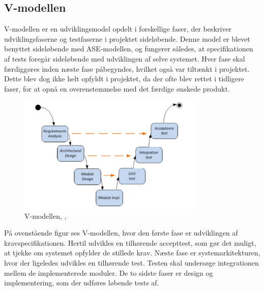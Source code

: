 \subsection{V-modellen}
V-modellen er en udviklingsmodel opdelt i forskellige faser, der beskriver udviklingsfaserne og testfaserne i projektet sideløbende. Denne model er blevet benyttet sideløbende med ASE-modellen, og fungerer således, at specifikationen af tests foregår sideløbende med udviklingen af selve systemet. Hver fase skal færdiggøres inden næste fase påbegyndes, hvilket også var tiltænkt i projektet. Dette blev dog ikke helt opfyldt i projektet, da der ofte blev rettet i tidligere faser, for at opnå en overenstemmelse med det færdige ønskede produkt. 
\begin{figure}[H]
	\centering
	\includegraphics[width=0.8\textwidth]{Figurer/vmodel}
	\caption{V-modellen, \protect\cite[s. 4]{Vejledning}, \protect\cite{ISE}}
\end{figure}
På ovenstående figur ses V-modellen, hvor den første fase er udviklingen af kravspecifikationen. Hertil udvikles en tilhørende accepttest, som gør det muligt, at tjekke om systemet opfylder de stillede krav. Næste fase er systemarkitekturen, hvor der ligeledes udvikles en tilhørende test. Testen skal undersøge integrationen mellem de implementerede moduler. De to sidste faser er design og implementering, som der udføres løbende tests af. 


